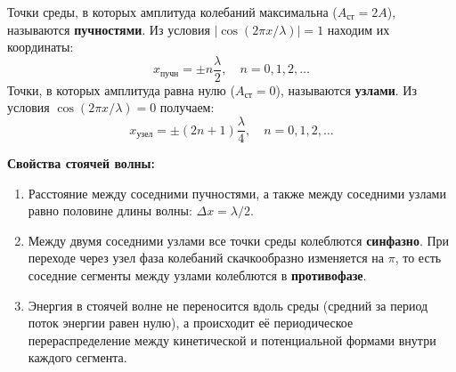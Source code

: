 \begin{property}
Точки среды, в которых амплитуда колебаний максимальна ($A_{\text{ст}} = 2A$), называются \textbf{пучностями}. Из условия $|\cos(2\pi x/\lambda)| = 1$ находим их координаты:
\begin{equation}
    x_{\text{пучн}} = \pm n \frac{\lambda}{2}, \quad n = 0, 1, 2, \dots \label{eq:antinodes}
\end{equation}
Точки, в которых амплитуда равна нулю ($A_{\text{ст}} = 0$), называются \textbf{узлами}. Из условия $\cos(2\pi x/\lambda) = 0$ получаем:
\begin{equation}
    x_{\text{узел}} = \pm (2n+1) \frac{\lambda}{4}, \quad n = 0, 1, 2, \dots \label{eq:nodes}
\end{equation}
\end{property}

\begin{remark}
\textbf{Свойства стоячей волны:}
\begin{enumerate}
    \item Расстояние между соседними пучностями, а также между соседними узлами равно половине длины волны: $\Delta x = \lambda/2$.
    \item Между двумя соседними узлами все точки среды колеблются \textbf{синфазно}. При переходе через узел фаза колебаний скачкообразно изменяется на $\pi$, то есть соседние сегменты между узлами колеблются в \textbf{противофазе}.
    \item Энергия в стоячей волне не переносится вдоль среды (средний за период поток энергии равен нулю), а происходит её периодическое перераспределение между кинетической и потенциальной формами внутри каждого сегмента.
\end{enumerate}
\end{remark}

